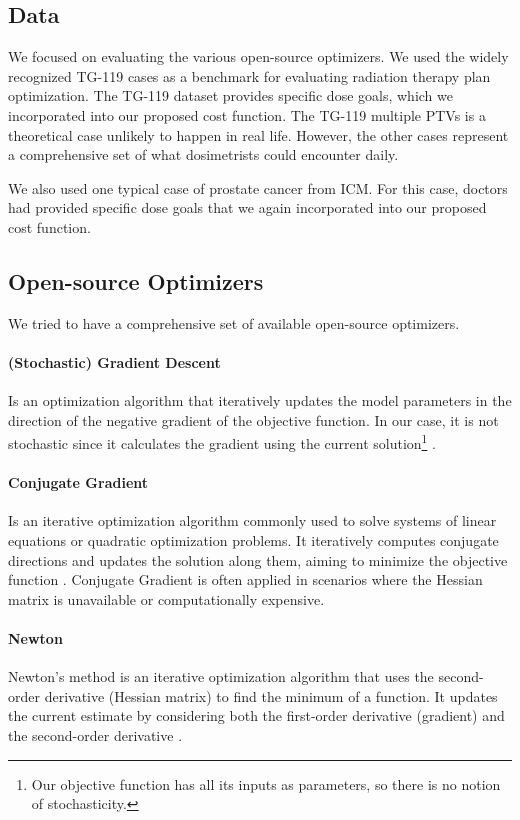 \subsection{Data}
We focused on evaluating the various open-source optimizers.
We used the widely recognized TG-119 \cite{AAPM-TG119} cases as a benchmark for evaluating radiation therapy plan optimization.
The TG-119 dataset provides specific dose goals, which we incorporated into our proposed cost function.
The TG-119 multiple PTVs is a theoretical case unlikely to happen in real life.
However, the other cases represent a comprehensive set of what dosimetrists could encounter daily.

We also used one typical case of prostate cancer from ICM.
For this case, doctors had provided specific dose goals that we again incorporated into our proposed cost function.

\subsection{Open-source Optimizers}
We tried to have a comprehensive set of available open-source optimizers.
\paragraph{(Stochastic) Gradient Descent}
Is an optimization algorithm that iteratively updates the model parameters in the direction of the negative gradient of the objective function.
In our case, it is not stochastic since it calculates the gradient using the current solution\footnote{Our objective function has all its inputs as parameters, so there is no notion of stochasticity.} \cite{Lemarechal2012}.
\paragraph{Conjugate Gradient}
Is an iterative optimization algorithm commonly used to solve systems of linear equations or quadratic optimization problems.
It iteratively computes conjugate directions and updates the solution along them, aiming to minimize the objective function \cite{Hestenes1952}.
Conjugate Gradient is often applied in scenarios where the Hessian matrix is unavailable or computationally expensive.
\paragraph{Newton}
Newton's method is an iterative optimization algorithm that uses the second-order derivative (Hessian matrix) to find the minimum of a function.
It updates the current estimate by considering both the first-order derivative (gradient) and the second-order derivative \cite{Nocedal06}.
